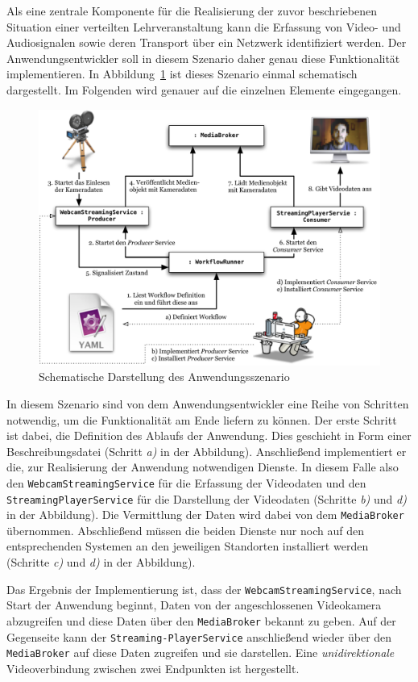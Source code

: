   Als eine zentrale Komponente für die Realisierung der zuvor beschriebenen Situation einer verteilten Lehrveranstaltung kann die Erfassung von Video- und Audiosignalen sowie deren Transport über ein Netzwerk identifiziert werden. Der Anwendungsentwickler soll in diesem Szenario daher genau diese Funktionalität implementieren. In Abbildung~\ref{fig:schema_des_anwendungsszenario} ist dieses Szenario einmal schematisch dargestellt. Im Folgenden wird genauer auf die einzelnen Elemente eingegangen.

\begin{figure}[ht]
  \centering
    \includegraphics[width=.9\textwidth]{images/Anwendungsszenario.pdf}
  \caption{Schematische Darstellung des Anwendungsszenario}
  \label{fig:schema_des_anwendungsszenario}
\end{figure}

  In diesem Szenario sind von dem Anwendungsentwickler eine Reihe von Schritten notwendig, um die Funktionalität am Ende liefern zu können. Der erste Schritt ist dabei, die Definition des Ablaufs der Anwendung. Dies geschieht in Form einer Beschreibungsdatei (Schritt \emph{a)} in der Abbildung). Anschließend implementiert er die, zur Realisierung der Anwendung notwendigen Dienste. In diesem Falle also den \verb!WebcamStreamingService!  für die Erfassung der Videodaten und den \verb!StreamingPlayerService! für die Darstellung der Videodaten (Schritte \emph{b)} und \emph{d)} in der Abbildung). Die Vermittlung der Daten wird dabei von dem \verb!MediaBroker! übernommen. Abschließend müssen die beiden Dienste nur noch auf den entsprechenden Systemen an den jeweiligen Standorten installiert werden (Schritte \emph{c)} und \emph{d)} in der Abbildung).
  
  Das Ergebnis der Implementierung ist, dass der \verb!WebcamStreamingService!, nach Start der Anwendung beginnt, Daten von der angeschlossenen Videokamera abzugreifen und diese Daten über den \verb!MediaBroker! bekannt zu geben. Auf der Gegenseite kann der \verb!Streaming-PlayerService! anschließend wieder über den \verb!MediaBroker! auf diese Daten zugreifen und sie darstellen. Eine \emph{unidirektionale} Videoverbindung zwischen zwei Endpunkten ist hergestellt.


